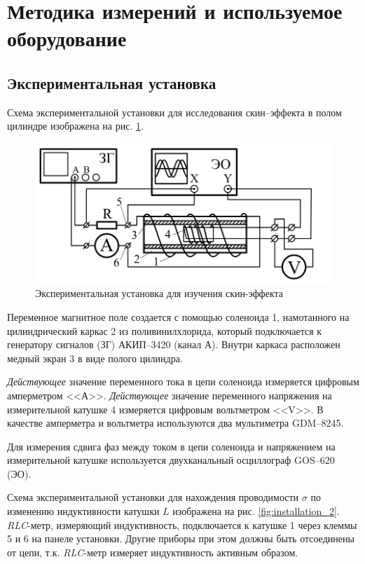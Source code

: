 \documentclass[a4paper, 12pt]{article}
\begin{document}
    

    \section{Методика измерений и используемое оборудование}

    \subsection{Экспериментальная установка}

    Схема экспериментальной установки для исследования скин–эффекта в полом цилиндре изображена на рис. \ref{fig:installation_1}.

    \begin{figure}[H]
        \centering
        \includegraphics[width = 14 cm]{images/installation_1.png}
        \caption{Экспериментальная установка для изучения скин-эффекта}
        \label{fig:installation_1}
    \end{figure}

    Переменное магнитное поле создается с помощью соленоида 1, намотанного на цилиндрический каркас 2 из поливинилхлорида, который подключается к генератору сигналов (ЗГ) АКИП–3420 (канал А). Внутри каркаса расположен медный экран 3 в виде полого цилиндра. 
    
    \textit{Действующее} значение переменного тока в цепи соленоида измеряется цифровым амперметром <<А>>. \textit{Действующее} значение переменного напряжения на измерительной катушке 4 измеряется цифровым вольтметром <<V>>. В качестве амперметра и вольтметра используются два мультиметра GDM–8245.
    
    Для измерения сдвига фаз между током в цепи соленоида и напряжением на измерительной катушке используется двухканальный осциллограф GOS–620 (ЭО).

    Схема экспериментальной установки для нахождения проводимости $\sigma$ по изменению индуктивности катушки $L$ изображена на рис. \ref{fig:installation_2}. \textit{RLC}-метр, измеряющий индуктивность, подключается к катушке 1 через клеммы 5 и 6 на панеле установки. Другие приборы при этом должны быть отсоединены от цепи, т.к. \textit{RLC}-метр измеряет индуктивность активным образом.
\end{document}
